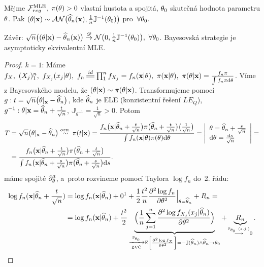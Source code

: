 \begin{dusl}
	Mějme $\mathcal{F}_{reg}^{\mathrm{{\footnotesize MLE }}}$, $\pi(\theta)>0$ vlastní hustota a spojitá, $\theta_0$ skutečná hodnota parametru $\theta$. Pak $(\theta|\textbf{x})\sim\mathcal{AN}\big(\widehat{\theta}_n(\textbf{x}),\frac{1}{n}\mathbb{J}^{-1}(\theta_0)\big)$ pro~$\forall\theta_0$.
	
	Závěr: $\sqrt{n}\big( (\theta|\textbf{x})-\widehat{\theta}_n(\textbf{x}) \big)\stackrel{\mathscr{D}}{\to} \mathcal{N}\big( 0,\frac{1}{n}\mathbb{J}^{-1}(\theta_0) \big),~\forall\theta_0$. Bayesovská strategie je asymptoticky ekvivalentní MLE.
	\begin{proof}
		$k=1$: Máme $f_{X},~(X_j)_1^n,~f_{X_j}(x_j|\t),~f_n\equal{id}\prod_1^n f_{X_j}=f_n(\textbf{x}|\t),~\pi(\textbf{x}|\t),~\pi(\t|\textbf{x})=\frac{f_n \pi}{\int f_n \pi\d\t}$. Víme z Bayesovského modelu, že $(\theta|\textbf{x})\sim\pi(\theta|\textbf{x})$. Transformujeme pomocí $g: t=\sqrt{n}\big( \theta|_\textbf{x}-\widehat{\theta}_n \big)$, kde $\widehat{\theta}_n$ je ELE (konzistentní řešení $LE_Q$), $g^{-1}:\theta|\textbf{x}=\widehat{\theta}_n + \frac{t}{\sqrt{n}}$, $\mathbb{J}_{g^{-1}}=\frac{1}{\sqrt{n}}>0$. Potom
		\[
		\begin{split}
		T&=\sqrt{n}\big(\theta|_\textbf{x}-\widehat{\theta}_n\big)\stackrel{ozn.}{\sim}\pi(t|\textbf{x})=\frac{f_n\big(\textbf{x}|\widehat{\theta}_n+\frac{t}{\sqrt{n}}\big)\pi\big( \widehat{\theta}_n+\frac{t}{\sqrt{n}} \big)\big(\frac{1}{\sqrt{n}}\big)}{\int f_n(\textbf{x}|\theta)\pi(\theta)\mathrm{d}\theta}=\left|\begin{array}{l}
		\theta=\widehat{\theta}_n+\frac{s}{\sqrt{n}}\\\mathrm{d}\theta=\frac{\mathrm{d} s}{\sqrt{n}}\end{array}
		\right|=\\ &=\frac{f_n\big(\textbf{x}|\widehat{\theta}_n+\frac{t}{\sqrt{n}}\big)\pi\big( \widehat{\theta}_n+\frac{t}{\sqrt{n}} \big)}{\int f_n\big(\textbf{x}|\widehat{\theta}_n+\frac{s}{\sqrt{n}}\big)\pi\big( \widehat{\theta}_n+\frac{s}{\sqrt{n}} \big)\mathrm{d} s}.
		\end{split}
		\]
		máme spojité $\partial_\theta^3$, a~proto rozvineme pomocí Taylora $\log f_n$ do~2. řádu:
		\[
		\begin{split}
		\log f_n(\textbf{x}|\htn+\frac{t}{\sqrt{n}})&=\log f_n(\textbf{x}|\htn)+0\text{\footnotemark}+\frac{1}{2}\frac{t^2}{n}\frac{\partial^2 \log f_n}{\partial\t^2}\Big|_{\t=\htn}+R_n=\\&=\log f_n(\textbf{x}|\htn)+\frac{t^2}{2}\underbrace{\Big( \frac{1}{n}\sumjn \frac{\partial^2 \log f_{X_j}(x_j|\htn)}{\partial\t^2} \Big)}_{\xrightarrow[\text{ZVČ}]{\PP_{\t_0}}\EE{\frac{\partial^2\log f_X}{\partial\t^2}}=-\mathbb{J}(\htn)\wedge \htn\rightarrow \t_0}+\underbrace{R_n}_{\stackrel{\PP_{\t_0}~(s.j.)}{\longrightarrow}0}.
		\end{split}
		\]

\end{proof}
\end{dusl}
